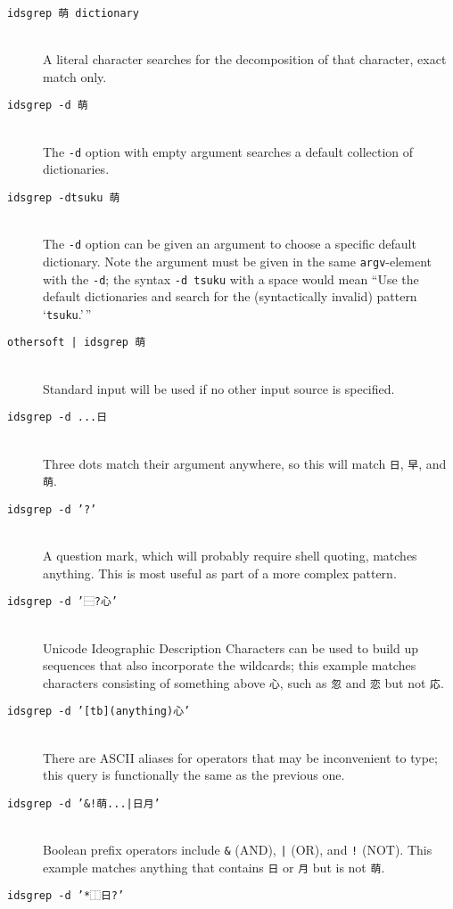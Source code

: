 \documentclass[twocolumn]{report}
\begin{document}
\begin{description}
\item[\texttt{idsgrep 萌 dictionary}]~\\
  A literal character searches for the decomposition of that character,
  exact match only.
\item[\texttt{idsgrep -d 萌}]~\\
  The \texttt{-d} option with empty argument searches a default collection
  of dictionaries.
\item[\texttt{idsgrep -dtsuku 萌}]~\\
  The \texttt{-d} option can be given an argument to choose a specific
  default dictionary.  Note the argument must be given in the same
  \texttt{argv}-element with the \texttt{-d}; the syntax \texttt{-d tsuku}
  with a space would mean ``Use the default dictionaries and search for the
  (syntactically invalid) pattern `\texttt{tsuku}.'\,''
\item[\texttt{othersoft | idsgrep 萌}]~\\
  Standard input will be used if no other input source is specified.
\item[\texttt{idsgrep -d ...日}]~\\
  Three dots match their argument anywhere, so this will match \texttt{日},
  \texttt{早}, and \texttt{萌}.
\item[\texttt{idsgrep -d '?'}]~\\
  A question mark, which will probably require shell quoting, matches
  anything.  This is most useful as part of a more complex pattern.
\item[\texttt{idsgrep -d '⿱?心'}]~\\
  Unicode Ideographic Description Characters can be used to build up
  sequences that also
  incorporate the wildcards; this example matches characters
  consisting of something above \texttt{心}, such as \texttt{忽} and
  \texttt{恋} but not \texttt{応}.
\item[\texttt{idsgrep -d '[tb](anything)心'}]~\\
  There are ASCII aliases
  for operators that may be inconvenient to type; this query is
  functionally the same as the previous one.
\item[\texttt{idsgrep -d '\&!萌...|日月'}]~\\
  Boolean prefix operators include \texttt{\&} (AND), \texttt{|} (OR), and
  \texttt \texttt{!} (NOT).  This example matches anything that contains
  \texttt{日} or \texttt{月} but is not \texttt{萌}.
\item[\texttt{idsgrep -d '*⿰日?'}]~\\

\end{description}
\end{document}
